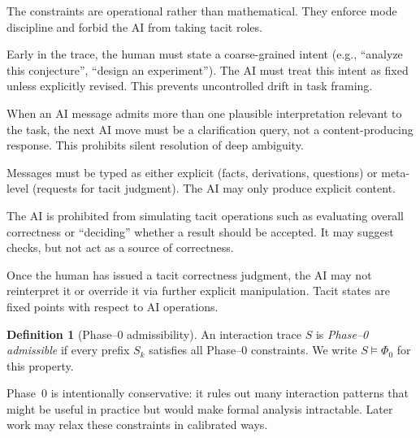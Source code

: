 \documentclass[11pt]{article}
\theoremstyle{definition}
\newtheorem{definition}[theorem]{Definition}
\begin{document}
The constraints are operational rather than mathematical. They enforce
mode discipline and forbid the AI from taking tacit roles.

\begin{description}[leftmargin=2em]
  \item[Intent locking.] Early in the trace, the human must state a
        coarse-grained intent (e.g., ``analyze this conjecture'',
        ``design an experiment''). The AI must treat this intent as fixed
        unless explicitly revised. This prevents uncontrolled drift in
        task framing.

  \item[Ambiguity resolution.] When an AI message admits more than one
        plausible interpretation relevant to the task, the next AI move
        must be a clarification query, not a content-producing response.
        This prohibits silent resolution of deep ambiguity.

  \item[Mode discipline.] Messages must be typed as either explicit
        (facts, derivations, questions) or meta-level (requests for
        tacit judgment). The AI may only produce explicit content.

  \item[No tacit emulation.] The AI is prohibited from simulating tacit
        operations such as evaluating overall correctness or ``deciding''
        whether a result should be accepted. It may suggest checks, but
        not act as a source of correctness.

  \item[Correctness stability.] Once the human has issued a tacit
        correctness judgment, the AI may not reinterpret it or override
        it via further explicit manipulation. Tacit states are fixed
        points with respect to AI operations.
\end{description}

\begin{definition}[Phase--0 admissibility]
An interaction trace \(S\) is \emph{Phase--0 admissible} if every prefix
\(S_k\) satisfies all Phase--0 constraints. We write \(S \vDash \Phi_0\)
for this property.
\end{definition}

Phase~0 is intentionally conservative: it rules out many interaction
patterns that might be useful in practice but would make formal analysis
intractable. Later work may relax these constraints in calibrated ways.
\end{document}

